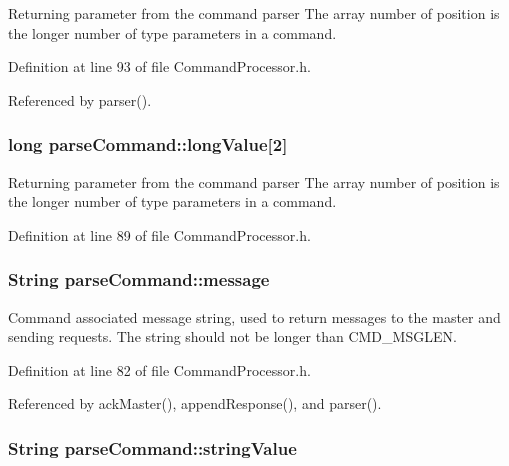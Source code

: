 Returning parameter from the command parser The array number of position is the longer number of type parameters in a command. 



Definition at line 93 of file Command\-Processor.\-h.



Referenced by parser().

\hypertarget{structparse_command_a10deac33dc255dd8a8b84532bbeb6c42}{
\subsubsection[{long\-Value}]{\setlength{\rightskip}{0pt plus 5cm}long parse\-Command\-::long\-Value\mbox{[}2\mbox{]}}}\label{structparse_command_a10deac33dc255dd8a8b84532bbeb6c42}


Returning parameter from the command parser The array number of position is the longer number of type parameters in a command. 



Definition at line 89 of file Command\-Processor.\-h.

\hypertarget{structparse_command_a5d2f84606922f34ad6a8ca5f7d8a59b5}{
\subsubsection[{message}]{\setlength{\rightskip}{0pt plus 5cm}String parse\-Command\-::message}}\label{structparse_command_a5d2f84606922f34ad6a8ca5f7d8a59b5}


Command associated message string, used to return messages to the master and sending requests. The string should not be longer than C\-M\-D\-\_\-\-M\-S\-G\-L\-E\-N. 



Definition at line 82 of file Command\-Processor.\-h.



Referenced by ack\-Master(), append\-Response(), and parser().

\hypertarget{structparse_command_ac5ece0b161e3fae794d08911247c0b1e}{
\subsubsection[{string\-Value}]{\setlength{\rightskip}{0pt plus 5cm}String parse\-Command\-::string\-Value}}\label{structparse_command_ac5ece0b161e3fae794d08911247c0b1e}


